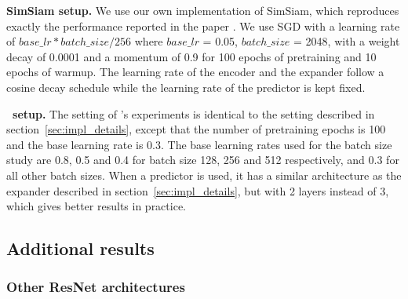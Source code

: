 \textbf{SimSiam setup.} We use our own implementation of SimSiam, which reproduces exactly the performance reported in the paper \cite{chen2020simsiam}. We use SGD with a learning rate of $base\_lr * batch\_size / 256$ where $base\_lr$ = 0.05, $batch\_size$ = 2048, with a weight decay of 0.0001 and a momentum of 0.9 for 100 epochs of pretraining and 10 epochs of warmup. The learning rate of the encoder and the expander follow a cosine decay schedule while the learning rate of the predictor is kept fixed.

\textbf{\algo \ setup.} The setting of \algo's experiments is identical to the setting described in section~\ref{sec:impl_details}, except that the number of pretraining epochs is 100 and the base learning rate is 0.3. The base learning rates used for the batch size study are 0.8, 0.5 and 0.4 for batch size 128, 256 and 512 respectively, and 0.3 for all other batch sizes. When a predictor is used, it has a similar architecture as the expander described in section~\ref{sec:impl_details}, but with 2 layers instead of 3, which gives better results in practice.

\subsection{Additional results} \label{app:additional_results}

\subsubsection{Other ResNet architectures}

